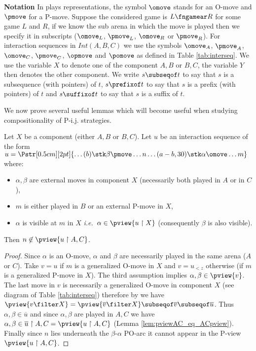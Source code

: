 {\bf Notation} In plays representations,
the symbol $\omove$ stands for an
O-move and $\pmove$ for
a P-move. 
Suppose the considered game is $L\fngamear R$ 
for some game $L$ and $R$, if we know the sub arena in which the move is played
then we specify it in subscripts ($\omove_L$, $\pmove_L$, $\omove_R$ or $\pmove_R$). For interaction sequences in $Int(A,B,C)$ we use
the symbols $\omove_A$, $\pmove_A$, $\omove_C$, $\pmove_C$, $\opmove$ and $\pomove$ as defined in Table \ref{tab:interseq}. We use the variable $X$ to denote one of the component $A,B$ or $B,C$, the variable  $Y$
then denotes the other component.
We write $s \subseqof t$ to say that $s$ is a subsequence (with pointers) of $t$, $s \prefixof t$ to say that $s$ is a prefix (with pointers)
of $t$ and  $s \suffixof t$ to say that $s$ is a suffix of $t$.

We now prove several useful lemmas which will become useful when studying compositionality of P-i.j. strategies.

\begin{lemma}
\label{lem:interjump}
Let $X$ be a component (either  $A,B$ or  $B,C$).
Let $u$ be an interaction sequence of the form
$ u =  
\Pstr[0.5cm][2pt]{ \ldots (b){\stk \beta \pmove}  \ldots
 {n}  \ldots  (a-b,30){\stk \alpha\omove}
\ldots m}$ where:
\begin{itemize}[-]
\item $\alpha,\beta$ are external moves in component $X$ (necessarily both played in $A$ or in $C$),
\item  $m$ is either played in $B$ or an external P-move in $X$,
\item  $\alpha$ is visible at $m$ in $X$ \emph{i.e.}~$\alpha\in \pview{u \upharpoonright X}$ (consequently $\beta$ is also visible).
\end{itemize}
Then $n \not\in \pview{u \upharpoonright A, C}$.
\end{lemma}
\begin{proof}
Since $\alpha$ is an O-move, $\alpha$ and $\beta$ are necessarily played in the same arena ($A$ or $C$).
Take $v=u$ if $m$ is a generalized O-move in $X$
and $v=u_{<z}$ otherwise (if $m$ is a generalized P-move in $X$).
The third assumption implies 
$\alpha,\beta\in \pview{v}$.
The last move in $v$ is necessarily a generalized O-move in component $X$ (see diagram of Table \ref{tab:interseq}) 
therefore by \cite[Lemma 3.3.1]{Harmer2005}
we have $\pview{v \filter X} = \pview{\overline{v} \filter X} \subseqof \overline{v} \subseqof \overline{u}$.
Thus $\alpha,\beta \in \overline{u}$ and
since $\alpha,\beta$ are played in $A,C$ we have 
$\alpha,\beta  \in \overline{u} \upharpoonright A,C 
= \pview{u \upharpoonright A,C}$ (Lemma \ref{lem:pviewAC_eq_ACpview}).
Finally since $n$ lies underneath the $\beta$-$\alpha$ PO-arc 
it cannot appear in the P-view  $\pview{u \upharpoonright A,C}$.
\end{proof}

